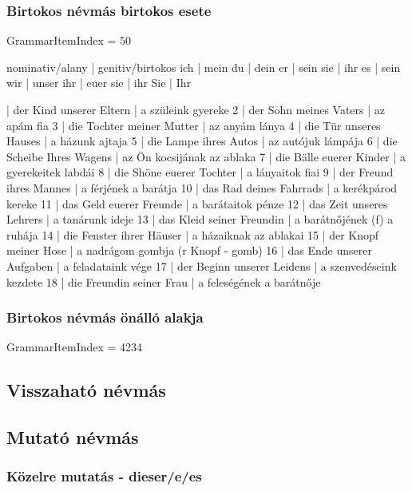 \documentclass{article}
\newenvironment{desc}{\verbatim}{\endverbatim}
\newenvironment{exmp}{\verbatim}{\endverbatim}
\begin{document}
\subsubsection{Birtokos névmás birtokos esete}

GrammarItemIndex = 50

\begin{desc}
nominativ/alany | genitiv/birtokos 
ich             | mein
du              | dein
er              | sein
sie             | ihr
es              | sein
wir             | unser
ihr             | euer
sie             | ihr
Sie             | Ihr
\end{desc}

\begin{exmp}
1 | der Kind unserer Eltern | a szüleink gyereke
2 | der Sohn meines Vaters | az apám fia
3 | die Tochter meiner Mutter | az anyám lánya
4 | die Tür unseres Hauses | a házunk ajtaja
5 | die Lampe ihres Autos | az autójuk lámpája
6 | die Scheibe Ihres Wagens | az Ön kocsijának az ablaka
7 | die Bälle euerer Kinder | a gyerekeitek labdái
8 | die Shöne euerer Tochter | a lányaitok fiai
9 | der Freund ihres Mannes | a férjének a barátja
10 | das Rad deines Fahrrads | a kerékpárod kereke
11 | das Geld euerer Freunde | a barátaitok pénze
12 | das Zeit unseres Lehrers | a tanárunk ideje
13 | das Kleid seiner Freundin | a barátnőjének (f) a ruhája
14 | die Fenster ihrer Häuser | a házaiknak az ablakai
15 | der Knopf meiner Hose | a nadrágom gombja (r Knopf - gomb)
16 | das Ende unserer Aufgaben | a feladataink vége
17 | der Beginn unserer Leidens | a szenvedéseink kezdete
18 | die Freundin seiner Frau | a feleségének a barátnője
\end{exmp}

\subsubsection{Birtokos névmás önálló alakja}

GrammarItemIndex = 4234

\subsection{Visszaható névmás}

\subsection{Mutató névmás}

\subsubsection{Közelre mutatás - dieser/e/es}
\end{document}
